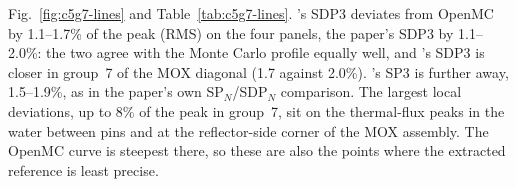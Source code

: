 Fig.~\ref{fig:c5g7-lines} and Table~\ref{tab:c5g7-lines}. \garnet's SDP3
deviates from OpenMC by 1.1--1.7\% of the peak (RMS) on the four panels, the
paper's SDP3 by 1.1--2.0\%: the two agree with the Monte Carlo profile equally
well, and \garnet's SDP3 is closer in group~7 of the MOX diagonal (1.7
against 2.0\%). \garnet's SP3 is further away, 1.5--1.9\%, as in the paper's
own SP$_N$/SDP$_N$ comparison. The largest local deviations, up to 8\% of the
peak in group~7, sit on the thermal-flux peaks in the water between pins and
at the reflector-side corner of the MOX assembly. The OpenMC curve is
steepest there, so these are also the points where the extracted reference is
least precise.
